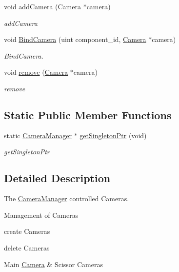 \begin{DoxyCompactItemize}
void \hyperlink{classEngine_1_1CameraManager_a684eae9f1a8ad86d55be797c7531739a}{add\+Camera} (\hyperlink{classEngine_1_1Camera}{Camera} $\ast$camera)
\begin{DoxyCompactList}\small\item\em add\+Camera \end{DoxyCompactList}\item 
void \hyperlink{classEngine_1_1CameraManager_a7b3d0de66044139377679bc5791a887e}{Bind\+Camera} (uint component\+\_\+id, \hyperlink{classEngine_1_1Camera}{Camera} $\ast$camera)
\begin{DoxyCompactList}\small\item\em Bind\+Camera. \end{DoxyCompactList}\item 
void \hyperlink{classEngine_1_1CameraManager_a6d55a74104cd4a15a4522bef410ee53e}{remove} (\hyperlink{classEngine_1_1Camera}{Camera} $\ast$camera)
\begin{DoxyCompactList}\small\item\em remove \end{DoxyCompactList}\end{DoxyCompactItemize}
\subsection*{Static Public Member Functions}
\begin{DoxyCompactItemize}
\item 
static \hyperlink{classEngine_1_1CameraManager}{Camera\+Manager} $\ast$ \hyperlink{classEngine_1_1CameraManager_af980601c66f5441cfdd7cf3affe156f5}{get\+Singleton\+Ptr} (void)
\begin{DoxyCompactList}\small\item\em get\+Singleton\+Ptr \end{DoxyCompactList}\end{DoxyCompactItemize}


\subsection{Detailed Description}
The \hyperlink{classEngine_1_1CameraManager}{Camera\+Manager} controlled Cameras. 

Management of Cameras


\begin{DoxyItemize}
\item create Cameras
\item delete Cameras
\item Main \hyperlink{classEngine_1_1Camera}{Camera} \& Scissor Cameras 
\end{DoxyItemize}

